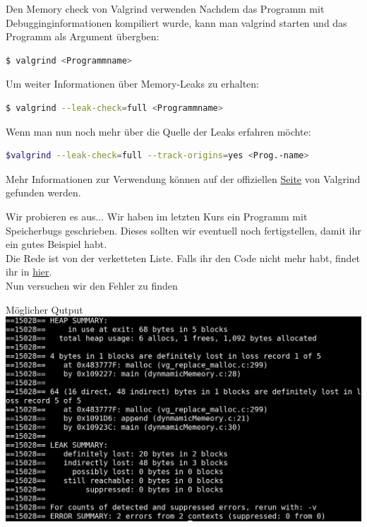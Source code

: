 \begin{frame}[fragile]{Den Memory check von Valgrind verwenden}
Nachdem das Programm mit Debugginginformationen kompiliert wurde, kann man valgrind starten und das Programm als Argument übergben:
\begin{lstlisting}[numbers=none,language=bash]
$ valgrind <Programmname>\end{lstlisting}
Um weiter Informationen über Memory-Leaks zu erhalten:
\begin{lstlisting}[numbers=none,language=bash]
$ valgrind --leak-check=full <Programmname>\end{lstlisting}
Wenn man nun noch mehr über die Quelle der Leaks erfahren möchte:
\begin{lstlisting}[numbers=none,language=bash]
$valgrind --leak-check=full --track-origins=yes <Prog.-name>\end{lstlisting}

Mehr Informationen zur Verwendung können auf der offiziellen \href{http://valgrind.org/docs/manual/quick-start.html}{Seite} von Valgrind gefunden werden.
\end{frame}
\begin{frame}[fragile]{Wir probieren es aus...}
Wir haben im letzten Kurs ein Programm mit Speicherbugs geschrieben. Dieses sollten wir eventuell noch fertigstellen, damit ihr ein gutes Beispiel habt. \\
\bigskip
Die Rede ist von der verketteten Liste. Falls ihr den Code nicht mehr habt, findet ihr in \href{https://github.com/scholzp/c-lessons/blob/master/materials/memory_allocation/dynmamicMemeory.c}{hier}.\\
Nun versuchen wir den Fehler zu finden
\end{frame}
\begin{frame}[fragile]{Möglicher Qutput}
\includegraphics[width = \linewidth]{../img/valgrind.png}
\end{frame}

